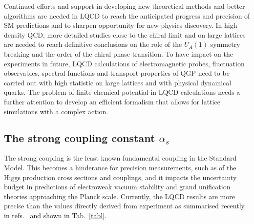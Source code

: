 Continued efforts  and support in developing new theoretical methods and better algorithms are needed in  LQCD  to reach the  anticipated progress and  precision   of  SM  predictions  and to  sharpen  opportunity for new physics  discovery.  In high density QCD, more detailed studies close to the chiral limit and on large lattices are needed to reach  definitive  conclusions  on  the  role  of the  $U_A(1)$ symmetry  breaking   and the order of the chiral phase transition. To  have  impact  on  the experiments in  future,  LQCD  calculations  of  electromagnetic  probes, fluctuation observables, spectral functions   and transport properties   of  QGP  need  to be carried out with high statistic on large lattices and with physical dynamical quarks. The problem of finite chemical potential in LQCD calculations needs a further attention to develop an efficient  formalism that allows for lattice simulations
with a complex action.

\subsection{The strong coupling constant $\alpha_s$}


The strong coupling is the least known fundamental coupling in the Standard Model. This becomes a hinderance for precision measurements, such as of the Higgs production cross sections and couplings, and it impacts the uncertainty budget in predictions of electroweak vacuum stability and grand unification theories approaching the Planck scale.
Currently, the LQCD results are more precise than the values directly derived from experiment as summarised recently in refs.~\cite{Bethke:2017uli,dEnterria:2019its} and shown in Tab.~\ref{tabl}. %


